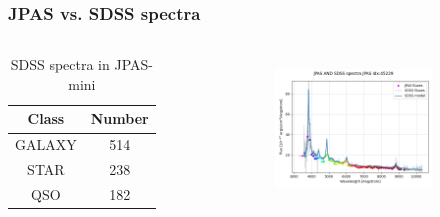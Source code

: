 \documentclass{beamer}
\begin{document}
\begin{frame}
    \frametitle{JPAS vs. SDSS spectra}
    \begin{columns}
        \begin{table}
            \caption{SDSS spectra in JPAS-mini}
            \centering
            \begin{tabular}{|c|c|}
                \hline
                Class & Number \\
                \hline
                    GALAXY   & 514 \\
                    STAR     & 238 \\
                    QSO      & 182 \\
                \hline
            \end{tabular}
        \end{table}
        \begin{figure}
            \begin{subfigure}{0.75\textwidth}
                \centering
                \includegraphics[width=1.0\textwidth]{../../figs/spec/jpas_sdss_45229.png}
            \end{subfigure}
            \pause
            \begin{subfigure}{0.75\textwidth}
                \centering

\end{subfigure}
\end{figure}
\end{columns}
\end{frame}
\end{document}
